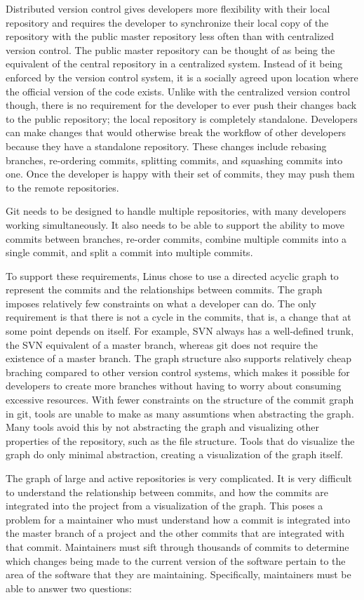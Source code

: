 Distributed version control gives developers more flexibility with their
local repository and requires the developer to synchronize their local
copy of the repository with the public master repository less often
than with centralized version control.
The public master repository can be thought of as being the equivalent
of the central repository in a centralized system.
Instead of it being enforced by the version control system,
it is a socially agreed upon location where the official version of the
code exists.
Unlike with the centralized version control though,
there is no requirement for the developer to ever push their changes
back to the public repository;
the local repository is completely standalone.
Developers can make changes that would otherwise break the workflow of
other developers because they have a standalone repository.
These changes include rebasing branches, re-ordering commits,
splitting commits, and squashing commits into one.
Once the developer is happy with their set of commits, they may push
them to the remote repositories.

Git needs to be designed to handle multiple repositories, with many
developers working simultaneously.
It also needs to be able to support the ability to move commits between
branches, re-order commits, combine multiple commits into a single
commit, and split a commit into multiple commits.

To support these requirements, Linus chose to use a directed acyclic
graph to represent the commits and the relationships between commits.
The graph imposes relatively few constraints on what a developer can do.
The only requirement is that there is not a cycle in the commits, that
is, a change that at some point depends on itself.
For example, SVN always has a well-defined trunk, the SVN equivalent of
a master branch, whereas git does not require the existence of a master
branch.
The graph structure also supports relatively cheap braching compared to
other version control systems, which makes it possible for developers to
create more branches without having to worry about consuming excessive
resources.
With fewer constraints on the structure of the commit graph in git,
tools are unable to make as many assumtions when abstracting the graph.
Many tools avoid this by not abstracting the graph and visualizing other
properties of the repository, such as the file structure.
Tools that do visualize the graph do only minimal abstraction, creating
a visualization of the graph itself.

The graph of large and active repositories is very complicated.
It is very difficult to understand the relationship between commits, and
how the commits are integrated into the project from a visualization of
the graph.
This poses a problem for a maintainer who must understand how a
commit is integrated into the master branch of a
project and the other commits that are integrated with that commit.
Maintainers must sift through thousands of commits to determine which
changes being made to the current version of the software pertain to
the area of the software that they are maintaining.
Specifically, maintainers must be able to answer two questions:

